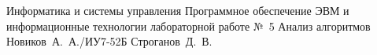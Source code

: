 \documentclass{bmstu}
\begin{document}
\makereporttitle
    {Информатика и системы управления}
    {Программное обеспечение ЭВМ и информационные технологии}
    {лабораторной работе №~5}
    {Анализ алгоритмов}
    {}
    {}
    {Новиков~А.~А./ИУ7-52Б}
    {Строганов~Д.~В.}

\renewcommand{\contentsname}{СОДЕРЖАНИЕ} 
\tableofcontents
\setcounter{page}{2}



\makebibliography
\end{document}
